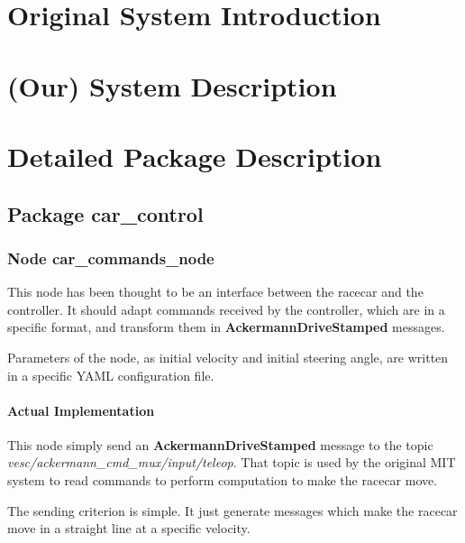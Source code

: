 \documentclass[12pt, letterpaper, oneside]{report}
\begin{document}
\chapter{Original System Introduction}
\chapter{(Our) System Description}
\chapter{Detailed Package Description}

\section{Package car\_control}

\subsection{Node car\_commands\_node}

This node has been thought to be an interface between the racecar and the controller. It should adapt commands received by the controller, which are in a specific format, and transform them in \textbf{AckermannDriveStamped} messages.

Parameters of the node, as initial velocity and initial steering angle, are written in a specific YAML configuration file.

\subsubsection{Actual Implementation}
This node simply send an \textbf{AckermannDriveStamped} message to the topic \textit{vesc\slash ackermann\_cmd\_mux\slash input\slash teleop}. That topic is used by the original MIT system to read commands to perform computation to make the racecar move.

The sending criterion is simple. It just generate messages which make the racecar move in a straight line at a specific velocity.
\end{document}
